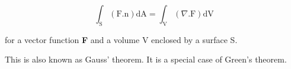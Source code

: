 \[ \int_{\mathrm{S}} ( \mathrm{F.n} ) \mathrm{dA} = \int_{\mathrm{V}}
 ( \nabla . \mathrm{F} ) \mathrm{dV} \]
\par
for a vector function \textbf{F} and a volume V enclosed by a surface S.
\par
This is also known as Gauss' theorem. It is a special case of
Green's theorem. 